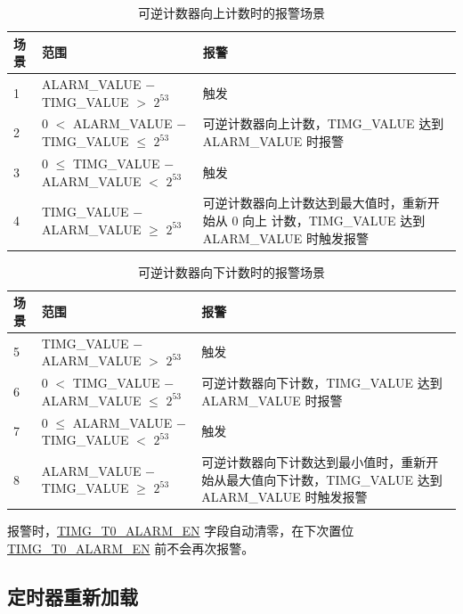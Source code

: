 \documentclass[main\_\_CN.tex]{subfiles}
\begin{document}
\begin{table}[H]
\centering
\caption{可逆计数器向上计数时的报警场景}
\label{tab:timg-alarm-generation-up}

\begin{tabular}{|l|l|m{7cm}|}
\hline
\rowcolor{lightgray}
    \textbf{场景} & \textbf{范围} & \textbf{报警} \\\hline
     1 & ALARM\_VALUE $-$ TIMG\_VALUE $>$ $2^{53}$ & 触发 \\\hline
     2 & 0 $<$ ALARM\_VALUE $-$ TIMG\_VALUE $\leq$ $2^{53}$ & 可逆计数器向上计数，TIMG\_VALUE 达到 ALARM\_VALUE 时报警 \\\hline
     3 & 0 $\leq$ TIMG\_VALUE $-$ ALARM\_VALUE $<$ $2^{53}$ & 触发 \\\hline
     4 & TIMG\_VALUE $-$ ALARM\_VALUE $\geq$ $2^{53}$ & 可逆计数器向上计数达到最大值时，重新开始从 0 向上 计数，TIMG\_VALUE 达到 ALARM\_VALUE 时触发报警\\\hline
\end{tabular}
\end{table}

\begin{table}[H]
\centering
\caption{可逆计数器向下计数时的报警场景}
\label{tab:timg-alarm-generation-down}

\begin{tabular}{|l|l|m{7cm}|}
\hline
\rowcolor{lightgray}
    \textbf{场景} & \textbf{范围} & \textbf{报警} \\\hline
     5 & TIMG\_VALUE $-$ ALARM\_VALUE  $>$ $2^{53}$ & 触发 \\\hline
     6 &  0 $<$ TIMG\_VALUE $-$ ALARM\_VALUE $\leq$ $2^{53}$ & 可逆计数器向下计数，TIMG\_VALUE 达到 ALARM\_VALUE 时报警 \\\hline
     7 & 0 $\leq$ ALARM\_VALUE $-$ TIMG\_VALUE $<$ $2^{53}$ & 触发 \\\hline
     8 & ALARM\_VALUE $-$ TIMG\_VALUE $\geq$ $2^{53}$ & 可逆计数器向下计数达到最小值时，重新开始从最大值向下计数，TIMG\_VALUE 达到 ALARM\_VALUE 时触发报警 \\\hline
\end{tabular}
\end{table}

报警时，\hyperref[fielddesc:TIMGTXALARMEN]{TIMG\_T0\_ALARM\_EN} 字段自动清零，在下次置位 \hyperref[fielddesc:TIMGTXALARMEN]{TIMG\_T0\_ALARM\_EN} 前不会再次报警。

\subsection{定时器重新加载}
\label{sec:timg-func-descr-reload}
\end{document}
